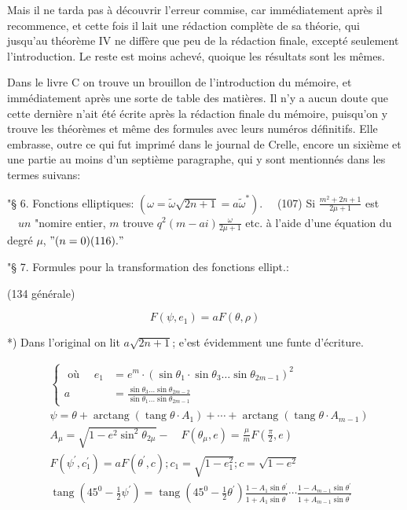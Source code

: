 \documentclass{article}
\begin{document}
Mais il ne tarda pas à découvrir l'erreur commise, car immédiatement après il recommence, et cette fois il lait une rédaction complète de sa théorie, qui jusqu'au théorème IV ne diffère que peu de la rédaction finale, excepté seulement l'introduction. Le reste est moins achevé, quoique les résultats sont les mêmes.

Dans le livre \(\mathrm{C}\) on trouve un brouillon de l'introduction du mémoire, et immédiatement après une sorte de table des matières. Il n'y a aucun doute que cette dernière n'ait été écrite après la rédaction finale du mémoire, puisqu'on y trouve les théorèmes et même des formules avec leurs numéros définitifs. Elle embrasse, outre ce qui fut imprimé dans le journal de Crelle, encore un sixième et une partie au moins d'un septième paragraphe, qui y sont mentionnés dans les termes suivans:

"§ 6. Fonctions elliptiques: \(\left(\omega=\tilde{\omega} \sqrt{2 n+1}=a \tilde{\omega}^{*}\right) . \quad\) (107) Si \(\frac{m^{2}+2 n+1}{2 \mu+1}\) est \(\quad u n\) "nomire entier, \(m\) trouve \(q^{2}(m-a i) \frac{\omega}{2 \mu+1}\) etc. à l'aide d'une équation du degré \(\mu\), \("(n=0)(116) . "\)

"§ 7. Formules pour la transformation des fonctions ellipt.:

(134 générale)

\[
F\left(\psi, e_{1}\right)=a F(\theta, \rho)
\]

*) Dans l'original on lit \(a \sqrt{2 n+1}\); e'est évidemment une funte d'écriture.

\[
\begin{aligned}
& \left\{\begin{aligned}
\text { où } \quad e_{1} & =e^{m} \cdot\left(\sin \theta_{1} \cdot \sin \theta_{3} \ldots \sin \theta_{2 m-1}\right)^{2} \\
a & =\frac{\sin \theta_{3} \ldots \sin \theta_{2 m-2}}{\sin \theta_{1} \ldots \sin \theta_{2 m-1}}
\end{aligned}\right. \\
& \psi=\theta+\operatorname{arctang}\left(\operatorname{tang} \theta \cdot A_{1}\right)+\cdots+\operatorname{arctang}\left(\operatorname{tang} \theta \cdot A_{m-1}\right) \\
& A_{\mu}=\sqrt{1-e^{2} \sin ^{2} \theta_{2 \mu}}-\quad F\left(\theta_{\mu}, e\right)=\frac{\mu}{m} F\left(\frac{\pi}{2}, e\right) \\
& F\left(\psi^{\prime}, c_{1}^{\prime}\right)=a F\left(\theta^{\prime}, c\right) ; c_{1}=\sqrt{1-e_{1}^{2}} ; c=\sqrt{1-e^{2}} \\
& \operatorname{tang}\left(45^{0}-\frac{1}{2} \psi^{\prime}\right)=\operatorname{tang}\left(45^{0}-\frac{1}{2} \theta^{\prime}\right) \frac{1-A_{1} \sin \theta^{\prime}}{1+A_{1} \sin \theta^{\prime}} \cdots \frac{1-A_{m-1} \sin \theta^{\prime}}{1+A_{m-1} \sin \theta^{\prime}}
\end{aligned}
\]
\end{document}

